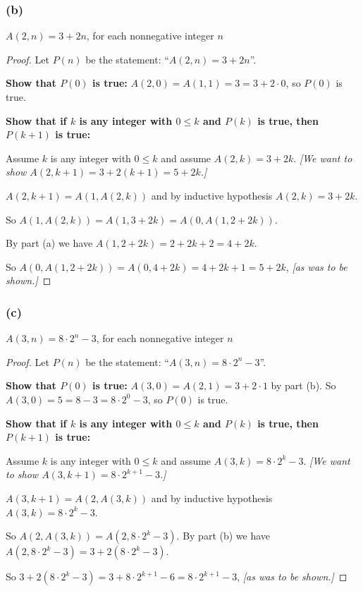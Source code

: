 \documentclass[14pt]{extarticle}
\begin{document}
\subsubsection{(b)}
\(A(2, n) = 3 + 2n\), for each nonnegative integer $n$

\begin{proof}
Let $P(n)$ be the statement: ``\(A(2, n) = 3 + 2n\)''.

{\bf Show that $P(0)$ is true:} \(A(2, 0) = A(1, 1) = 3 = 3 + 2 \cdot 0\), so $P(0)$ is true.

{\bf Show that if $k$ is any integer with \(0 \leq k\) and $P(k)$ is true, then $P(k+1)$ is true:}

Assume $k$ is any integer with \(0 \leq k\) and assume \(A(2, k) = 3 + 2k\). 
{\it [We want to show \(A(2, k+1) = 3+2(k+1) = 5+2k\).]}

\(A(2, k+1) = A(1, A(2, k))\) and by inductive hypothesis \(A(2, k) = 3+2k\).
 
So \(A(1, A(2, k)) = A(1, 3+2k) = A(0, A(1, 2+2k))\). 

By part (a) we have \(A(1, 2+2k) = 2+2k+2 = 4+2k\).

So \(A(0, A(1, 2+2k)) = A(0, 4+2k) = 4+2k+1 = 5+2k\), {\it [as was to be shown.]}
\end{proof}

\subsubsection{(c)}
\(A(3, n) = 8 \cdot 2^n - 3\), for each nonnegative integer $n$

\begin{proof}
Let $P(n)$ be the statement: ``\(A(3, n) = 8 \cdot 2^n - 3\)''.

{\bf Show that $P(0)$ is true:} \(A(3, 0) = A(2, 1) = 3 + 2 \cdot 1\) by part (b). 
So \(A(3, 0) = 5 = 8 - 3 = 8 \cdot 2^0 - 3\), so $P(0)$ is true.

{\bf Show that if $k$ is any integer with \(0 \leq k\) and $P(k)$ is true, then $P(k+1)$ is true:}

Assume $k$ is any integer with \(0 \leq k\) and assume \(A(3, k) = 8 \cdot 2^k - 3\). 
{\it [We want to show \(A(3, k+1) = 8 \cdot 2^{k+1}-3\).]}

\(A(3, k+1) = A(2, A(3, k))\) and by inductive hypothesis \(A(3, k) = 8 \cdot 2^k - 3\). 

So \(A(2, A(3, k)) = A(2, 8 \cdot 2^k - 3)\). By part (b) we have \(A(2, 8 \cdot 2^k - 3) = 3 + 2(8 \cdot 2^k - 3)\).

So \(3 + 2(8 \cdot 2^k - 3) = 3 + 8 \cdot 2^{k+1} - 6 = 8 \cdot 2^{k+1} - 3\), {\it [as was to be shown.]}
\end{proof}
\end{document}
